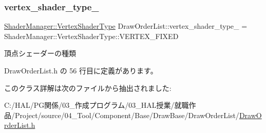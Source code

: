 \subsubsection{\texorpdfstring{vertex\+\_\+shader\+\_\+type\+\_\+}{vertex\_shader\_type\_}}
{\footnotesize\ttfamily \mbox{\hyperlink{class_shader_manager_a9b51e49d70eb3cc58f6d1f3994e8cfbd}{Shader\+Manager\+::\+Vertex\+Shader\+Type}} Draw\+Order\+List\+::vertex\+\_\+shader\+\_\+type\+\_\+ = Shader\+Manager\+::\+Vertex\+Shader\+Type\+::\+V\+E\+R\+T\+E\+X\+\_\+\+F\+I\+X\+ED\hspace{0.3cm}{\ttfamily [private]}}



頂点シェーダーの種類 



 Draw\+Order\+List.\+h の 56 行目に定義があります。



このクラス詳解は次のファイルから抽出されました\+:\begin{DoxyCompactItemize}
\item 
C\+:/\+H\+A\+L/\+P\+G関係/03\+\_\+作成プログラム/03\+\_\+\+H\+A\+L授業/就職作品/\+Project/source/04\+\_\+\+Tool/\+Component/\+Base/\+Draw\+Base/\+Draw\+Order\+List/\mbox{\hyperlink{_draw_order_list_8h}{Draw\+Order\+List.\+h}}\end{DoxyCompactItemize}
